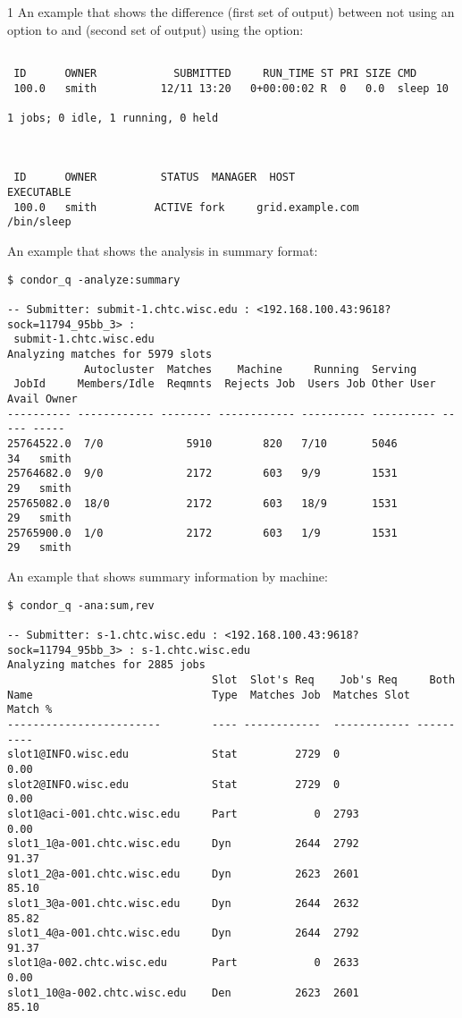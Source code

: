 \begin{ManPage}{\label{man-condor-q}}{1}
An example that shows the difference (first set of output)
between not using an option to  and (second
set of output) using the  option:
\footnotesize
\begin{verbatim}

 ID      OWNER            SUBMITTED     RUN_TIME ST PRI SIZE CMD
 100.0   smith          12/11 13:20   0+00:00:02 R  0   0.0  sleep 10

1 jobs; 0 idle, 1 running, 0 held



 ID      OWNER          STATUS  MANAGER  HOST                EXECUTABLE
 100.0   smith         ACTIVE fork     grid.example.com       /bin/sleep
\end{verbatim}
\normalsize

An example that shows the analysis in summary format:
\footnotesize
\begin{verbatim}
$ condor_q -analyze:summary

-- Submitter: submit-1.chtc.wisc.edu : <192.168.100.43:9618?sock=11794_95bb_3> :
 submit-1.chtc.wisc.edu
Analyzing matches for 5979 slots
            Autocluster  Matches    Machine     Running  Serving
 JobId     Members/Idle  Reqmnts  Rejects Job  Users Job Other User Avail Owner
---------- ------------ -------- ------------ ---------- ---------- ----- -----
25764522.0  7/0             5910        820   7/10       5046        34   smith
25764682.0  9/0             2172        603   9/9        1531        29   smith
25765082.0  18/0            2172        603   18/9       1531        29   smith
25765900.0  1/0             2172        603   1/9        1531        29   smith 
\end{verbatim}
\normalsize

An example that shows summary information by machine:
\footnotesize
\begin{verbatim}
$ condor_q -ana:sum,rev

-- Submitter: s-1.chtc.wisc.edu : <192.168.100.43:9618?sock=11794_95bb_3> : s-1.chtc.wisc.edu
Analyzing matches for 2885 jobs
                                Slot  Slot's Req    Job's Req     Both
Name                            Type  Matches Job  Matches Slot    Match %
------------------------        ---- ------------  ------------ ----------
slot1@INFO.wisc.edu             Stat         2729  0                  0.00
slot2@INFO.wisc.edu             Stat         2729  0                  0.00
slot1@aci-001.chtc.wisc.edu     Part            0  2793               0.00
slot1_1@a-001.chtc.wisc.edu     Dyn          2644  2792              91.37
slot1_2@a-001.chtc.wisc.edu     Dyn          2623  2601              85.10
slot1_3@a-001.chtc.wisc.edu     Dyn          2644  2632              85.82
slot1_4@a-001.chtc.wisc.edu     Dyn          2644  2792              91.37
slot1@a-002.chtc.wisc.edu       Part            0  2633               0.00
slot1_10@a-002.chtc.wisc.edu    Den          2623  2601              85.10 
\end{verbatim}
\normalsize


\end{ManPage}
